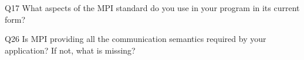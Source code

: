 \begin{description}%
\item{Q17} What aspects of the MPI standard do you use in your program in its current form?%
\item{Q26} Is MPI providing all the communication semantics required by your application? If not, what is missing?%
\end{description}%
